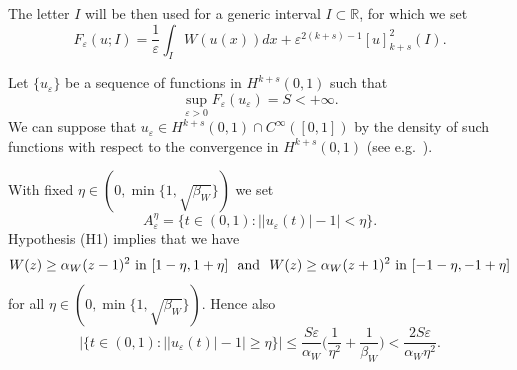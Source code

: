 \documentclass{article}
\newcommand{\e}{\varepsilon}
\begin{document}
The letter $I$ will be then used for a generic interval $I\subset \mathbb R$, for which we set
$$
F_\e(u;I)=\frac1\e\int_I W(u(x))dx+\e^{2(k+s)-1}[u]^2_{k+s}(I).
$$

\smallskip
Let $\{u_\e\}$ be a sequence of functions in $H^{k+s}(0,1)$ such that 
\begin{equation}\label{defS}
\sup_{\e>0}F_\e(u_\e)=S<+\infty. 
\end{equation}
We can suppose that $u_\e\in H^{k+s}(0,1)\cap C^\infty([0,1])$ by the density of such functions with respect to the convergence in $H^{k+s}(0,1)$ (see e.g.~\cite[Theorem 1.64]{leofrac}). 

\smallskip
With fixed $\eta\in(0,\min\{1,\sqrt{\beta_W}\})$ we set 
\begin{equation}\label{defAe}
A_\e^\eta=\{t\in(0,1): \big||u_\e(t)|-1\big|<\eta\}. 
\end{equation}
Hypothesis (H1) implies that we have 
$$W(z)\geq \alpha_W(z-1)^2 \ \hbox{\rm in }[1-\eta,1+\eta] \ \  \hbox{\rm and} \ \ W(z)\geq \alpha_W(z+1)^2 \ \hbox{\rm in }[-1-\eta,-1+\eta]$$
for all $\eta\in (0,\min\{1,\sqrt{\beta_W}\})$.
Hence also
\begin{equation}\label{mis} 
|\{t\in(0,1): ||u_\e(t)|-1|\geq \eta \}|\leq \frac{S\e }{\alpha_W}\Big(\frac{1}{\eta^2}+\frac{1}{\beta_W}\Big)<\frac{2S\e }{\alpha_W\eta^2}.
\end{equation}
\end{document}
